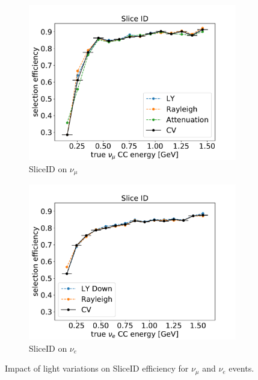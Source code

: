 \begin{figure}[H] 
\begin{center}
    \begin{subfigure}[b]{0.45\textwidth}
    \centering
    \includegraphics[width=1.00\textwidth]{detsys/light/nu_e_03232020_eff_light_numu.pdf}
    \caption{\label{fig:detsys:light:eff:numu}SliceID on $\nu_{\mu}$}
    \end{subfigure}
    \begin{subfigure}[b]{0.45\textwidth}
    \centering
    \includegraphics[width=1.00\textwidth]{detsys/light/nu_e_03232020_eff_light_nue.pdf}
    \caption{\label{fig:detsys:light:eff:nue}SliceID on $\nu_{e}$}
    \end{subfigure}
\caption{\label{fig:detsys:light:eff}Impact of light variations on SliceID efficiency for $\nu_{\mu}$ and $\nu_e$ events.}
\end{center}
\end{figure}
